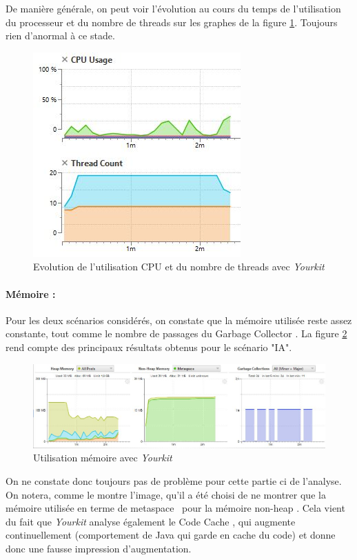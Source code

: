 \documentclass[12pt, openany]{report}
\begin{document}
De manière générale, on peut voir l'évolution au cours du temps de l'utilisation du processeur et du nombre de threads sur les graphes de la figure \ref{cpu-threads}. Toujours rien d'anormal à ce stade.
\begin{figure}[h]
	\centering
	\includegraphics{Images/cpu-threads.JPG}
	\caption{\label{cpu-threads} Evolution de l'utilisation CPU et du nombre de threads avec \textit{Yourkit}}
\end{figure}
\paragraph{Mémoire : }
Pour les deux scénarios considérés, on constate que la mémoire utilisée reste assez constante, tout comme le nombre de passages du \og Garbage Collector \fg. La figure \ref{memory} rend compte des principaux résultats obtenus pour le scénario "IA".
\begin{figure}[h]
	\centering
	\includegraphics[width=16cm]{Images/memory.JPG}
	\caption{\label{memory} Utilisation mémoire avec \textit{Yourkit}}
\end{figure}

On ne constate donc toujours pas de problème pour cette partie ci de l'analyse. On notera, comme le montre l'image, qu'il a été choisi de ne montrer que la mémoire utilisée en terme de \og metaspace \fg \, pour la mémoire \og non-heap \fg. Cela vient du fait que \textit{Yourkit} analyse également le \og Code Cache \fg, qui augmente continuellement (comportement de Java qui garde en cache du code) et donne donc une fausse impression d'augmentation.
\end{document}
